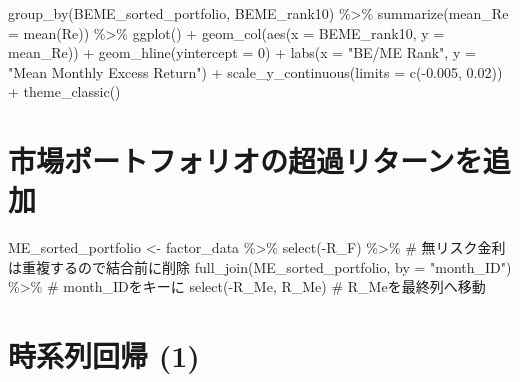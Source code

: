 \documentclass[
  letterpaper,
  DIV=11,
  numbers=noendperiod]{scrreprt}
\newenvironment{Shaded}{\begin{snugshade}}{\end{snugshade}}
\newcommand{\AttributeTok}[1]{\textcolor[rgb]{0.40,0.45,0.13}{#1}}
\newcommand{\CommentTok}[1]{\textcolor[rgb]{0.37,0.37,0.37}{#1}}
\newcommand{\DecValTok}[1]{\textcolor[rgb]{0.68,0.00,0.00}{#1}}
\newcommand{\FloatTok}[1]{\textcolor[rgb]{0.68,0.00,0.00}{#1}}
\newcommand{\FunctionTok}[1]{\textcolor[rgb]{0.28,0.35,0.67}{#1}}
\newcommand{\NormalTok}[1]{\textcolor[rgb]{0.00,0.23,0.31}{#1}}
\newcommand{\OtherTok}[1]{\textcolor[rgb]{0.00,0.23,0.31}{#1}}
\newcommand{\SpecialCharTok}[1]{\textcolor[rgb]{0.37,0.37,0.37}{#1}}
\newcommand{\StringTok}[1]{\textcolor[rgb]{0.13,0.47,0.30}{#1}}
\begin{document}
\begin{Shaded}
\begin{Highlighting}[]
\FunctionTok{group\_by}\NormalTok{(BEME\_sorted\_portfolio, BEME\_rank10) }\SpecialCharTok{\%\textgreater{}\%}
  \FunctionTok{summarize}\NormalTok{(}\AttributeTok{mean\_Re =} \FunctionTok{mean}\NormalTok{(Re)) }\SpecialCharTok{\%\textgreater{}\%}
  \FunctionTok{ggplot}\NormalTok{() }\SpecialCharTok{+} 
  \FunctionTok{geom\_col}\NormalTok{(}\FunctionTok{aes}\NormalTok{(}\AttributeTok{x =}\NormalTok{ BEME\_rank10, }\AttributeTok{y =}\NormalTok{ mean\_Re)) }\SpecialCharTok{+} 
  \FunctionTok{geom\_hline}\NormalTok{(}\AttributeTok{yintercept =} \DecValTok{0}\NormalTok{) }\SpecialCharTok{+} 
  \FunctionTok{labs}\NormalTok{(}\AttributeTok{x =} \StringTok{"BE/ME Rank"}\NormalTok{, }\AttributeTok{y =} \StringTok{"Mean Monthly Excess Return"}\NormalTok{) }\SpecialCharTok{+} 
  \FunctionTok{scale\_y\_continuous}\NormalTok{(}\AttributeTok{limits =} \FunctionTok{c}\NormalTok{(}\SpecialCharTok{{-}}\FloatTok{0.005}\NormalTok{, }\FloatTok{0.02}\NormalTok{)) }\SpecialCharTok{+} 
  \FunctionTok{theme\_classic}\NormalTok{()}
\end{Highlighting}
\end{Shaded}

\section{市場ポートフォリオの超過リターンを追加}\label{ux5e02ux5834ux30ddux30fcux30c8ux30d5ux30a9ux30eaux30aaux306eux8d85ux904eux30eaux30bfux30fcux30f3ux3092ux8ffdux52a0}

\begin{Shaded}
\begin{Highlighting}[]
\NormalTok{ME\_sorted\_portfolio }\OtherTok{\textless{}{-}}\NormalTok{ factor\_data }\SpecialCharTok{\%\textgreater{}\%} 
  \FunctionTok{select}\NormalTok{(}\SpecialCharTok{{-}}\NormalTok{R\_F) }\SpecialCharTok{\%\textgreater{}\%} \CommentTok{\# 無リスク金利は重複するので結合前に削除}
  \FunctionTok{full\_join}\NormalTok{(ME\_sorted\_portfolio, }\AttributeTok{by =} \StringTok{"month\_ID"}\NormalTok{) }\SpecialCharTok{\%\textgreater{}\%} \CommentTok{\# month\_IDをキーに}
  \FunctionTok{select}\NormalTok{(}\SpecialCharTok{{-}}\NormalTok{R\_Me, R\_Me) }\CommentTok{\# R\_Meを最終列へ移動}
\end{Highlighting}
\end{Shaded}

\section{時系列回帰 (1)}\label{ux6642ux7cfbux5217ux56deux5e30-1}
\end{document}
